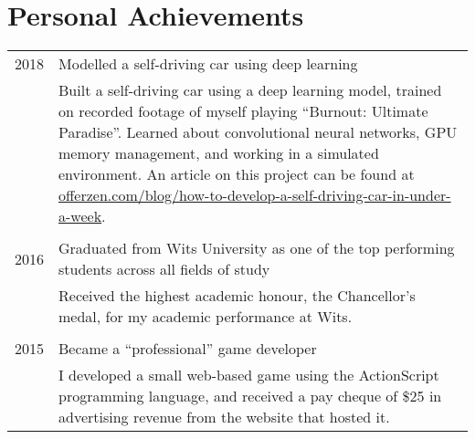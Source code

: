 \section{Personal Achievements}

\begin{supertabular}{p{1.8cm}|p{12cm}}
	2018 & Modelled a self-driving car using deep learning \\
	& \footnotesize{Built a self-driving car using a deep learning model, trained on recorded footage of myself playing “Burnout: Ultimate Paradise”.  Learned about convolutional neural networks, GPU memory management, and working in a simulated environment. An article on this project can be found at \href{https://www.offerzen.com/blog/how-to-develop-a-self-driving-car-in-under-a-week}{offerzen.com/blog/how-to-develop-a-self-driving-car-in-under-a-week}}. \\
	 \\
	2016 & Graduated from Wits University as one of the top performing students across all fields of study \\
	& \footnotesize{Received the highest academic honour, the Chancellor’s medal, for my academic performance at Wits.} \\
	 \\
	2015 & Became a ``professional'' game developer \\
	& \footnotesize{I developed a small web-based game using the ActionScript programming language, and received a pay cheque of \$25 in advertising revenue from the website that hosted it.}\\
\end{supertabular}